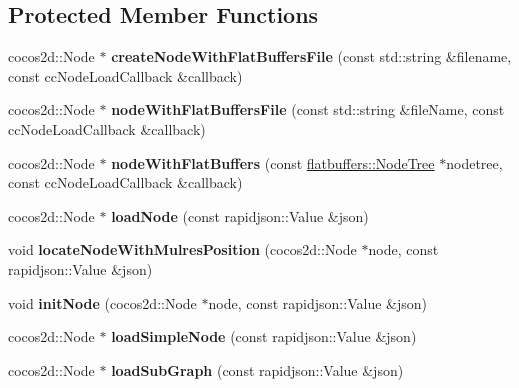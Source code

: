 \subsection*{Protected Member Functions}
\begin{DoxyCompactItemize}
\item 
\mbox{\label{classCSLoader_af8b6c685b9f34a64138dc7476336ebbe}} 
cocos2d\+::\+Node $\ast$ {\bfseries create\+Node\+With\+Flat\+Buffers\+File} (const std\+::string \&filename, const cc\+Node\+Load\+Callback \&callback)
\item 
\mbox{\label{classCSLoader_a5755333d569ca14f5b1fa40e5af99b36}} 
cocos2d\+::\+Node $\ast$ {\bfseries node\+With\+Flat\+Buffers\+File} (const std\+::string \&file\+Name, const cc\+Node\+Load\+Callback \&callback)
\item 
\mbox{\label{classCSLoader_a836f263e91553770924c1031e878ab39}} 
cocos2d\+::\+Node $\ast$ {\bfseries node\+With\+Flat\+Buffers} (const \hyperlink{structflatbuffers_1_1NodeTree}{flatbuffers\+::\+Node\+Tree} $\ast$nodetree, const cc\+Node\+Load\+Callback \&callback)
\item 
\mbox{\label{classCSLoader_aceb668d9dadc9c335d4acfdf2becad56}} 
cocos2d\+::\+Node $\ast$ {\bfseries load\+Node} (const rapidjson\+::\+Value \&json)
\item 
\mbox{\label{classCSLoader_a2da41fc25515fa661dcc6fa1895cdf8d}} 
void {\bfseries locate\+Node\+With\+Mulres\+Position} (cocos2d\+::\+Node $\ast$node, const rapidjson\+::\+Value \&json)
\item 
\mbox{\label{classCSLoader_ae957f2baff1c6822b322fcef083418b5}} 
void {\bfseries init\+Node} (cocos2d\+::\+Node $\ast$node, const rapidjson\+::\+Value \&json)
\item 
\mbox{\label{classCSLoader_a5724d2b39315741cbc790f19c13ef524}} 
cocos2d\+::\+Node $\ast$ {\bfseries load\+Simple\+Node} (const rapidjson\+::\+Value \&json)
\item 
\mbox{\label{classCSLoader_af406a91bed64ba15a5e7064fddc84270}} 
cocos2d\+::\+Node $\ast$ {\bfseries load\+Sub\+Graph} (const rapidjson\+::\+Value \&json)

\end{DoxyCompactItemize}
